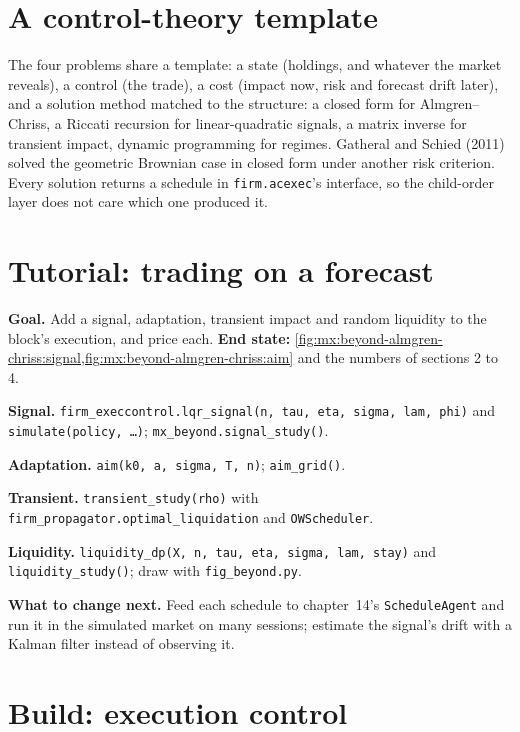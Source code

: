 \section{A control-theory template}

The four problems share a template: a state (holdings, and whatever the market reveals), a control (the trade), a cost (impact now, risk and forecast
drift later), and a solution method matched to the structure: a closed form for Almgren--Chriss, a Riccati recursion for linear-quadratic signals, a
matrix inverse for transient impact, dynamic programming for regimes. Gatheral and Schied (2011) solved the geometric Brownian case in closed form under
another risk criterion. Every solution returns a schedule in \texttt{firm.acexec}'s interface, so the child-order layer does not care which one produced it.

\section{Tutorial: trading on a forecast}\label{tut:mx:beyond-almgren-chriss:tut}

\begin{tutorial}
\textbf{Goal.} Add a signal, adaptation, transient impact and random liquidity to the block's execution, and price each.
\textbf{End state:} \cref{fig:mx:beyond-almgren-chriss:signal,fig:mx:beyond-almgren-chriss:aim} and the numbers of sections 2 to 4.
\begin{tutsteps}
\item \textbf{Signal.} \texttt{firm\_execcontrol.lqr\_signal(n, tau, eta, sigma, lam, phi)} and \texttt{simulate(policy, \dots)}; \texttt{mx\_beyond.signal\_study()}.
\item \textbf{Adaptation.} \texttt{aim(k0, a, sigma, T, n)}; \texttt{aim\_grid()}.
\item \textbf{Transient.} \texttt{transient\_study(rho)} with \texttt{firm\_propagator.optimal\_liquidation} and \texttt{OWScheduler}.
\item \textbf{Liquidity.} \texttt{liquidity\_dp(X, n, tau, eta, sigma, lam, stay)} and \texttt{liquidity\_study()}; draw with \texttt{fig\_beyond.py}.
\end{tutsteps}
\textbf{What to change next.} Feed each schedule to chapter~14's \texttt{ScheduleAgent} and run it in the simulated market on many sessions; estimate the
signal's drift with a Kalman filter instead of observing it.
\end{tutorial}

\section{Build: execution control}\label{bld:mx:beyond-almgren-chriss:execcontrol}

